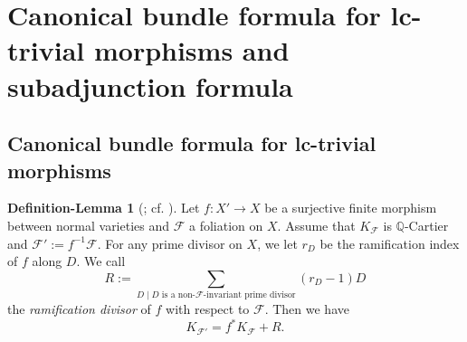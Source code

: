 \documentclass[11pt]{amsart}
\numberwithin{equation}{section}
\newcommand{\Qq}{\mathbb{Q}}
\newcommand{\Ff}{\mathcal{F}}
\theoremstyle{definition}
\theoremstyle{definition}
\newtheorem{deflem}[thm]{Definition-Lemma}
\theoremstyle{definition}
\begin{document}
\section{Canonical bundle formula for lc-trivial morphisms and subadjunction formula}\label{sec: subadj}

\subsection{Canonical bundle formula for lc-trivial morphisms}

\begin{deflem}[{\cite[Proposition 3.4]{Dru21}; cf. \cite[Proposition 3.7]{Spi20}}]\label{deflem: hurwitz foliation}
    Let $f: X'\rightarrow X$ be a surjective finite morphism between normal varieties and $\Ff$ a foliation on $X$. Assume that $K_{\Ff}$ is $\Qq$-Cartier and $\Ff':=f^{-1}\Ff$. For any prime divisor on $X$, we let $r_D$ be the ramification index of $f$ along $D$. We call
    $$R:=\sum_{D\mid D\text{ is a non-}\Ff\text{-invariant prime divisor}}(r_D-1)D$$
    the \emph{ramification divisor} of $f$ with respect to $\Ff$. Then we have
    $$K_{\Ff'}=f^*K_{\Ff}+R.$$
\end{deflem}
\end{document}
